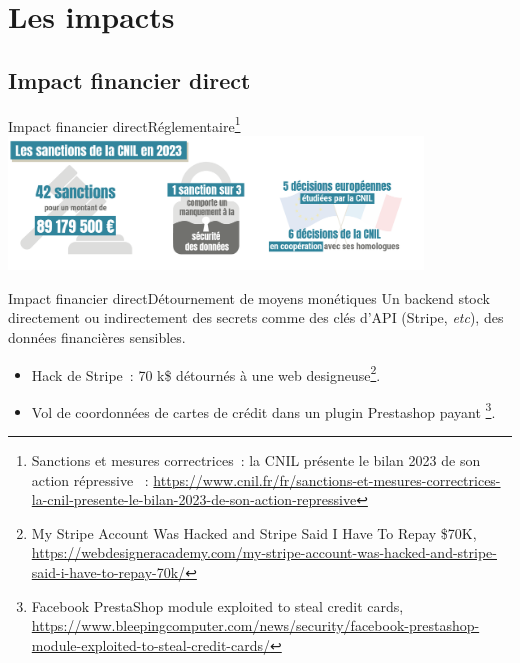 \documentclass{beamer}
\begin{document}
    \section{Les impacts}\label{sec:les-impacts}

    \subsection{Impact financier direct}\label{subsec:impact-financier-direct}
    \begin{frame}{Impact financier direct}{Réglementaire\footnote{Sanctions et mesures correctrices~: la CNIL présente le bilan 2023 de son action répressive ~: \url{https://www.cnil.fr/fr/sanctions-et-mesures-correctrices-la-cnil-presente-le-bilan-2023-de-son-action-repressive}}}
        \centering
        \includegraphics[width=11cm]{image/sanctions-cnil-2023}
    \end{frame}

    \begin{frame}{Impact financier direct}{Détournement de moyens monétiques}
        Un backend stock directement ou indirectement des secrets comme des clés d'API (Stripe, \textit{etc}), des données financières sensibles.
        \begin{itemize}
            \item Hack de Stripe~: 70 k\$ détournés à une web designeuse\footnote{My Stripe Account Was Hacked and Stripe Said I Have To Repay \$70K, \url{https://webdesigneracademy.com/my-stripe-account-was-hacked-and-stripe-said-i-have-to-repay-70k/}}.
            \item Vol de coordonnées de cartes de crédit dans un plugin Prestashop payant \footnote{Facebook PrestaShop module exploited to steal credit cards, \url{https://www.bleepingcomputer.com/news/security/facebook-prestashop-module-exploited-to-steal-credit-cards/}}.
        \end{itemize}
    \end{frame}
\end{document}

